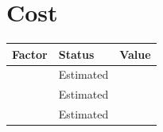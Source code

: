 \documentclass[11pt,a4paper]{article}
\begin{document}

\section*{Cost}


\small
\renewcommand{\arraystretch}{1.1}
\begin{tabularx}{\textwidth}{@{}X>{\centering\arraybackslash}p{3.2cm}>{\raggedleft\arraybackslash}p{3.0cm}@{}}
\toprule
\textbf{Factor} & \textbf{Status} & \textbf{Value} \\
\midrule
 &
Estimated &
 \\
 &
Estimated &
 \\
 &
Estimated &
 \\
\bottomrule
\end{tabularx}
\normalsize




\end{document}
